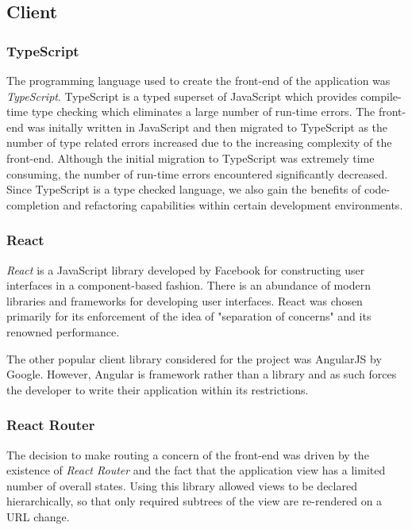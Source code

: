 \documentclass{l4proj}
\begin{document}
    \subsection{Client}
    
        \subsubsection{TypeScript}
        The programming language used to create the front-end of the application was \textit{TypeScript}. TypeScript is a typed superset of JavaScript which provides compile-time type checking which eliminates a large number of run-time errors. The front-end was initally written in JavaScript and then migrated to TypeScript as the number of type related errors increased due to the increasing complexity of the front-end. Although the initial migration to TypeScript was extremely time consuming, the number of run-time errors encountered significantly decreased. Since TypeScript is a type checked language, we also gain the benefits of code-completion and refactoring capabilities within certain development environments. 
    
        \subsubsection{React}
        \textit{React} is a JavaScript library developed by Facebook for constructing user interfaces in a component-based fashion. There is an abundance of modern libraries and frameworks for developing user interfaces. React was chosen primarily for its enforcement of the idea of "separation of concerns" and its renowned performance.
        
        The other popular client library considered for the project was AngularJS by Google. However, Angular is framework rather than a library and as such forces the developer to write their application within its restrictions.

        \subsubsection{React Router}
        The decision to make routing a concern of the front-end was driven by the existence of \textit{React Router} and the fact that the application view has a limited number of overall states. Using this library allowed views to be declared hierarchically, so that only required subtrees of the view are re-rendered on a URL change.
\end{document}
